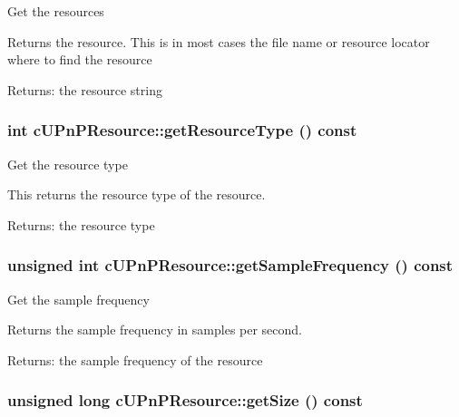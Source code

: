Get the resources

Returns the resource. This is in most cases the file name or resource locator where to find the resource

\begin{Desc}
\item[Returns:]the resource string \end{Desc}
\hypertarget{classcUPnPResource_6b6855ba6d4bd06805750ede92449c8d}{
\subsubsection[{getResourceType}]{\setlength{\rightskip}{0pt plus 5cm}int cUPnPResource::getResourceType () const}}
\label{classcUPnPResource_6b6855ba6d4bd06805750ede92449c8d}


Get the resource type

This returns the resource type of the resource.

\begin{Desc}
\item[Returns:]the resource type \end{Desc}
\hypertarget{classcUPnPResource_5ea6003b282c48f575bc54f5c9658ca9}{
\subsubsection[{getSampleFrequency}]{\setlength{\rightskip}{0pt plus 5cm}unsigned int cUPnPResource::getSampleFrequency () const}}
\label{classcUPnPResource_5ea6003b282c48f575bc54f5c9658ca9}


Get the sample frequency

Returns the sample frequency in samples per second.

\begin{Desc}
\item[Returns:]the sample frequency of the resource \end{Desc}
\hypertarget{classcUPnPResource_361f6991a29dddf575a2b0b63ce5a66a}{
\subsubsection[{getSize}]{\setlength{\rightskip}{0pt plus 5cm}unsigned long cUPnPResource::getSize () const}}
\label{classcUPnPResource_361f6991a29dddf575a2b0b63ce5a66a}


